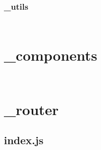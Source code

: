 \begin{lstlisting}[language=bash]

\end{lstlisting}



\begin{lstlisting}[language=bash]

\end{lstlisting}


\subsection{\_utils}




\begin{lstlisting}[language=bash]

\end{lstlisting}



\begin{lstlisting}[language=bash]

\end{lstlisting}



\chapter{\_components}


\begin{lstlisting}[language=bash]

\end{lstlisting}



\begin{lstlisting}[language=bash]

\end{lstlisting}



\chapter{\_router}


\section{index.js}



\begin{lstlisting}[language=bash]

\end{lstlisting}



